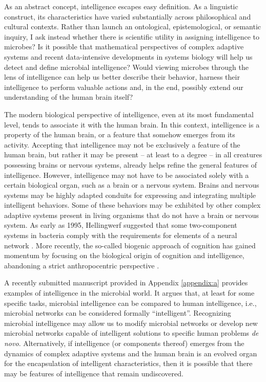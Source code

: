 As an abstract concept, intelligence escapes easy definition. As a linguistic construct, its characteristics have varied substantially across philosophical and cultural contexts. Rather than launch an ontological, epistemological, or semantic inquiry, I ask instead whether there is scientific utility in assigning intelligence to microbes? Is it possible that mathematical perspectives of complex adaptive systems and recent data-intensive developments in systems biology will help us detect and define microbial intelligence? Would viewing microbes through the lens of intelligence can help us better describe their behavior, harness their intelligence to perform valuable actions and, in the end, possibly extend our understanding of the human brain itself?

The modern biological perspective of intelligence, even at its most fundamental level, tends to associate it with the human brain. In this context, intelligence is a property of the human brain, or a feature that somehow emerges from its activity. Accepting that intelligence may not be exclusively a feature of the human brain, but rather it may be present – at least to a degree – in all creatures possessing brains or nervous systems, already helps refine the general features of intelligence. However, intelligence may not have to be associated solely with a certain biological organ, such as a brain or a nervous system. Brains and nervous systems may be highly adapted conduits for expressing and integrating multiple intelligent behaviors. Some of these behaviors may be exhibited by other complex adaptive systems present in living organisms that do not have a brain or nervous system. As early as 1995, Hellingwerf suggested that some two-component systems in bacteria comply with the requirements for elements of a neural network \cite{hellingwerf_signal_1995}. More recently, the so-called biogenic approach of cognition has gained momentum by focusing on the biological origin of cognition and intelligence, abandoning a strict anthropocentric perspective \cite{lengeler_metabolic_2000,lyon_biogenic_2006}.

A recently submitted manuscript provided in Appendix \ref{appendix:a} provides examples of intelligence in the microbial world. It argues that, at least for some specific tasks, microbial intelligence can be compared to human intelligence, i.e., microbial networks can be considered formally ``intelligent''. Recognizing microbial intelligence may allow us to modify microbial networks or develop new microbial networks capable of intelligent solutions to specific human problems \textit{de novo}. Alternatively, if intelligence (or components thereof) emerges from the dynamics of complex adaptive systems and the human brain is an evolved organ for the encapsulation of intelligent characteristics, then it is possible that there may be features of intelligence that remain undiscovered.

